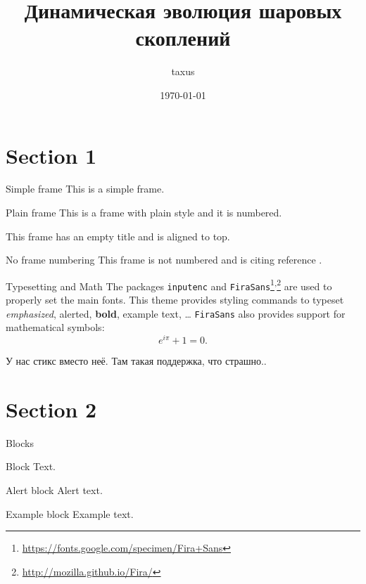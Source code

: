 \documentclass{beamer}
\title{Динамическая эволюция шаровых скоплений}
\subtitle{\underdev}
\author{taxus \\ \underdev}
\institute{СПбГУ}
\date{\today}
\begin{document}
    \begin{frame}
        \maketitle
    \end{frame}
    
    \section{Section 1}
    \begin{frame}{Simple frame}
        This is a simple frame.
    \end{frame}

    \begin{frame}[plain]{Plain frame}
        This is a frame with plain style and it is numbered.
    \end{frame}
    
    \begin{frame}[t]
        This frame has an empty title and is aligned to top.
    \end{frame}
    
    \begin{frame}[noframenumbering]{No frame numbering}
        This frame is not numbered and is citing reference \cite{knuth74}.
    \end{frame}
    
    \begin{frame}{Typesetting and Math}
        The packages \texttt{inputenc} and \texttt{FiraSans}\footnote{\url{https://fonts.google.com/specimen/Fira+Sans}}\textsuperscript{,}\footnote{\url{http://mozilla.github.io/Fira/}} are used to properly set the main fonts.
        \vfill
        This theme provides styling commands to typeset \emph{emphasized}, \alert{alerted}, \textbf{bold}, \textcolor{example}{example text}, \dots
        \vfill
        \texttt{FiraSans} also provides support for mathematical symbols:
        \begin{equation*}
            e^{i\pi} + 1 = 0.
        \end{equation*}

        У нас стикс вместо неё. Там такая поддержка, что страшно..
    \end{frame}

    \section{Section 2}
    \begin{frame}{Blocks}
        \begin{block}{Block}
            Text.
        \end{block}
        \pause
        \begin{alertblock}{Alert block}
            Alert \alert{text}.
        \end{alertblock}
        \pause
        \begin{exampleblock}{Example block}
            Example \textcolor{example}{text}.
        \end{exampleblock}
    \end{frame}
    
\end{document}
